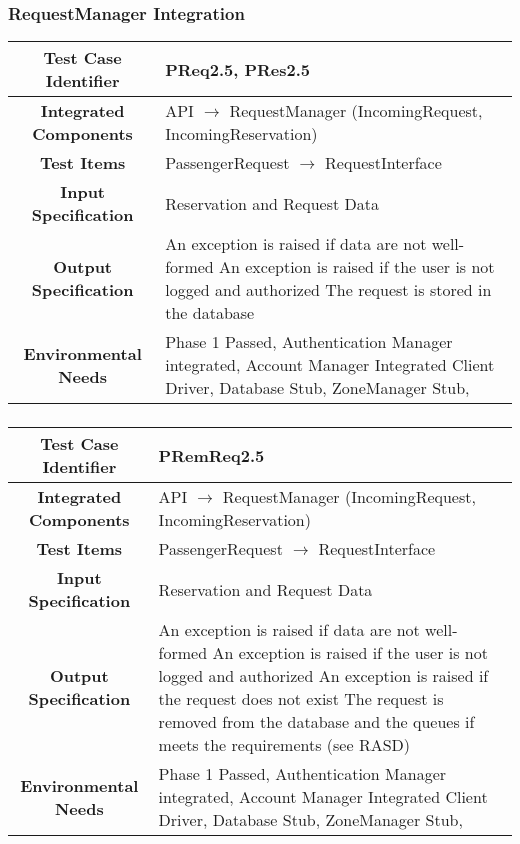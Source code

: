 \documentclass[11pt, a4paper,titlepage]{article}
\begin{document}
	 \subsubsection{RequestManager Integration}
	 	\begin{tabularx}{\textwidth}{| c|X|}
	 		\hline \textbf{Test Case Identifier} & \label{PReq2.5}PReq2.5, \label{PRes2.5}PRes2.5 \\
	 		\hline \textbf{Integrated Components} & API  $\rightarrow $ RequestManager (IncomingRequest, IncomingReservation) \\
	 		\hline \textbf{Test Items} & PassengerRequest $\rightarrow $ RequestInterface \\
	 		\hline \textbf{Input Specification} & Reservation and Request Data \\
	 		\hline \textbf{Output Specification} & An exception is raised if data are not well-formed \newline
												   An exception is raised if the user is not logged and authorized \newline
												   The request is stored in the database\\
	 		\hline \textbf{Environmental Needs} &  Phase 1 Passed, Authentication Manager integrated, Account Manager Integrated \newline 
	 		Client Driver, Database Stub, ZoneManager Stub,\\
	 		\hline
	 	\end{tabularx}
	 	\newline
	 \subsubsection{}
	 \begin{tabularx}{\textwidth}{| c|X|}
	 	\hline \textbf{Test Case Identifier} & \label{PRemReq2.5}PRemReq2.5 \\
	 	\hline \textbf{Integrated Components} & API  $\rightarrow $ RequestManager (IncomingRequest, IncomingReservation) \\
	 	\hline \textbf{Test Items} & PassengerRequest $\rightarrow $ RequestInterface \\
	 	\hline \textbf{Input Specification} & Reservation and Request Data \\
	 	\hline \textbf{Output Specification} & An exception is raised if data are not well-formed \newline
	 	An exception is raised if the user is not logged and authorized \newline
	 	An exception is raised if the request does not exist \newline
	 	The request is removed from the database and the queues if meets the requirements (see RASD)\\
	 	\hline \textbf{Environmental Needs} &  Phase 1 Passed, Authentication Manager integrated, Account Manager Integrated \newline 
	 	Client Driver, Database Stub, ZoneManager Stub,\\
	 	\hline
	 \end{tabularx}
	 \newline
\end{document}
